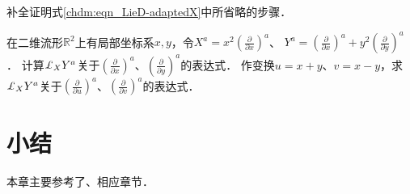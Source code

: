 \begin{exercise}
	补全证明式\eqref{chdm:eqn_LieD-adaptedX}中所省略的步骤．
\end{exercise}

\begin{exercise}
	在二维流形$\mathbb{R}^2$上有局部坐标系$x,y$，令$X^a = x^2 (\frac{\partial}{\partial x})^a$、
	$Y^a = (\frac{\partial}{\partial x})^a + y^2 (\frac{\partial}{\partial y})^a$．
	计算$\Lie_X Y^a$关于$(\frac{\partial}{\partial x})^a$、$(\frac{\partial}{\partial y})^a$的表达式．
	作变换$u=x+y$、$v=x-y$，求$\Lie_X Y^a$关于$(\frac{\partial}{\partial u})^a$、$(\frac{\partial}{\partial v})^a$的表达式．
\end{exercise}





\section*{小结}
本章主要参考了\parencite{cc2001-zh}、\parencite{chenwh2001}相应章节．
















\printbibliography[heading=subbibliography,title=第\ref{chdm}章参考文献]
\endinput
